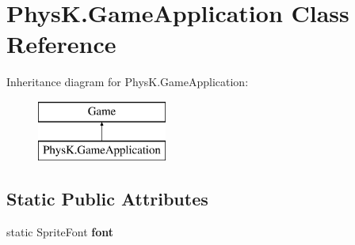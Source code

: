 \hypertarget{class_phys_k_1_1_game_application}{}\section{Phys\+K.\+Game\+Application Class Reference}
\label{class_phys_k_1_1_game_application}
Inheritance diagram for Phys\+K.\+Game\+Application\+:\begin{figure}[H]
\begin{center}
\leavevmode
\includegraphics[height=2.000000cm]{class_phys_k_1_1_game_application}
\end{center}
\end{figure}
\subsection*{Static Public Attributes}
\begin{DoxyCompactItemize}
\item 
static Sprite\+Font {\bfseries font}\hypertarget{class_phys_k_1_1_game_application_aaf3a468d312659adf60dda6c9f9db9d7}{}\label{class_phys_k_1_1_game_application_aaf3a468d312659adf60dda6c9f9db9d7}

\end{DoxyCompactItemize}
